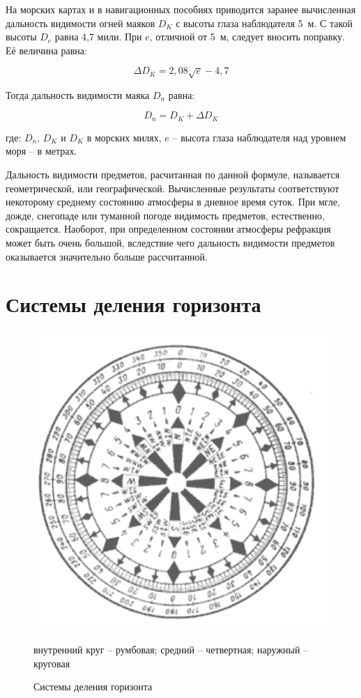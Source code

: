 \documentclass[a4paper, 12pt, twoside, final, book, russian, fittopage, cyremdash]{ncc}
\begin{document}
На морских картах и в навигационных пособиях приводится заранее вычисленная дальность видимости огней маяков $D_K$ с высоты глаза наблюдателя 5~м. С такой высоты $D_e$ равна 4,7 мили. При $e$, отличной от 5~м, следует вносить поправку. Её величина равна:

\begin{equation}
  \Delta D_K = 2,08 \sqrt{e} - 4,7 
\end{equation}

Тогда дальность видимости маяка $D_n$ равна: 

\begin{equation}
  D_n = D_K +  \Delta D_K 
\end{equation}

где: $D_n$, $D_K$ и $D_K$ в морских милях, $e$ \--- высота глаза наблюдателя над уровнем моря \--- в метрах.
 
Дальность видимости предметов, расчитанная по данной формуле, называется геометрической, или географической. Вычисленные результаты соответствуют некоторому среднему состоянию атмосферы в дневное время суток. При мгле, дожде, снегопаде или туманной погоде видимость предметов, естественно, сокращается. Наоборот, при определенном состоянии атмосферы рефракция может быть очень большой, вследствие чего дальность видимости предметов оказывается значительно больше рассчитанной. 

\section{Системы деления горизонта}

\begin{figure}[htb]
  \centering{}
  \includegraphics{N007}
  \caption{Системы деления горизонта}
  \label{fig:N7}
  \small
  \centering{}
  внутренний круг \--- румбовая; средний \--- четвертная; наружный \--- круговая
\end{figure}
\end{document}
